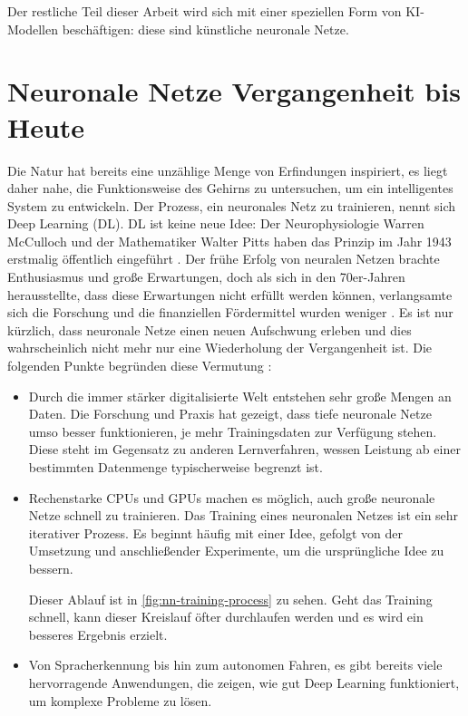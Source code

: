 \noindent
Der restliche Teil dieser Arbeit wird sich mit einer
speziellen Form von KI-Modellen beschäftigen: diese sind künstliche
neuronale Netze.

\section{Neuronale Netze Vergangenheit bis Heute}
Die Natur hat bereits eine unzählige Menge von Erfindungen
inspiriert, es liegt daher nahe, die Funktionsweise des Gehirns zu
untersuchen, um ein intelligentes System zu entwickeln.
Der Prozess, ein neuronales Netz zu trainieren, nennt sich Deep Learning (DL).
DL ist keine neue Idee:
Der Neurophysiologie Warren McCulloch und der Mathematiker Walter Pitts
haben das Prinzip im Jahr 1943 erstmalig öffentlich eingeführt
\parencite[280]{book:hands-on-ml}. Der frühe Erfolg von neuralen
Netzen brachte Enthusiasmus und große Erwartungen,
doch als sich in den 70er-Jahren herausstellte, dass diese Erwartungen nicht erfüllt
werden können, verlangsamte sich die Forschung und die finanziellen Fördermittel
wurden weniger \parencite[280]{book:hands-on-ml}.
Es ist nur kürzlich, dass neuronale Netze einen neuen Aufschwung erleben
und dies wahrscheinlich nicht mehr nur eine Wiederholung der Vergangenheit ist.
Die folgenden Punkte begründen diese Vermutung \parencite[280]{book:hands-on-ml}:
\begin{itemize}
  \item Durch die immer stärker digitalisierte Welt
        entstehen sehr große Mengen an Daten.
        Die Forschung und Praxis hat gezeigt, dass tiefe neuronale Netze umso besser funktionieren,
        je mehr Trainingsdaten zur Verfügung stehen. Diese steht im Gegensatz
        zu anderen Lernverfahren, wessen Leistung ab einer bestimmten
        Datenmenge typischerweise begrenzt ist.
  \item Rechenstarke CPUs und GPUs machen es möglich,
        auch große neuronale Netze
        schnell zu trainieren. Das Training eines neuronalen
        Netzes ist ein sehr iterativer Prozess.
        Es beginnt häufig mit einer Idee,
        gefolgt von der Umsetzung und anschließender Experimente, um die ursprüngliche
        Idee zu bessern.
        

        \noindent
        Dieser Ablauf ist in \autoref{fig:nn-training-process} zu sehen.
        Geht das Training schnell, kann dieser Kreislauf öfter durchlaufen
        werden und es wird ein besseres Ergebnis erzielt.
  \item Von Spracherkennung bis hin zum autonomen Fahren,
        es gibt bereits viele hervorragende Anwendungen, die zeigen,
        wie gut Deep Learning funktioniert, um komplexe Probleme zu lösen.
\end{itemize}
